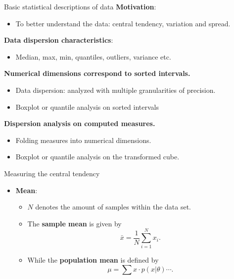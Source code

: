 \documentclass[aspectratio=169,t]{beamer}
\begin{document}
  { 
    \begin{frame}{Basic statistical descriptions of data}
    \textbf{Motivation}:
    \begin{itemize}
      \item To better understand the data: central tendency, variation and spread.
    \end{itemize}

    \textbf{Data dispersion characteristics}:
    \begin{itemize}
        \item Median, max, min, quantiles, outliers, variance etc.
    \end{itemize}

    \textbf{Numerical dimensions correspond to sorted intervals.}\\
    \begin{itemize}
      \item Data dispersion: analyzed with multiple granularities of precision.
      \item Boxplot or quantile analysis on sorted intervals
    \end{itemize}

  \textbf{Dispersion analysis on computed measures.}\\
    \begin{itemize}
        \item Folding measures into numerical dimensions.
        \item Boxplot or quantile analysis on the transformed cube.
    \end{itemize}
    \end{frame}
  }

  { 
    \begin{frame}{Measuring the central tendency}
    \begin{itemize}
      \item \textbf{Mean}:
      \begin{itemize}
          \item $N$ denotes the amount of samples within the data set.
          \item The \textbf{sample mean} is given by\\
                \begin{equation*}
                  \bar{x} = \frac{1}{N} \sum_{i=1}^{N} x_i.
                \end{equation*}
          \item While the \textbf{population mean} is defined by
                \begin{equation*}
                  \mu = \sum x \cdot p(x | \theta) \cdots.
                \end{equation*}
      \end{itemize}
    \end{itemize}
    \end{frame}
  }
\end{document}
